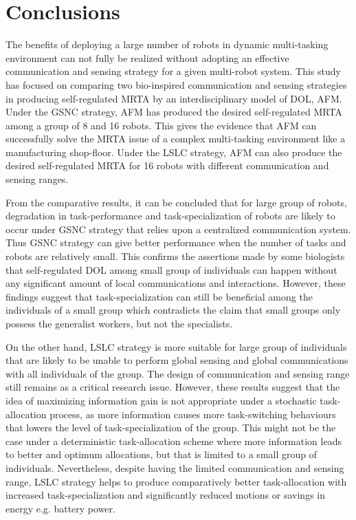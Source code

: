 \chapter{Conclusions}
The benefits of deploying a large number of robots in dynamic multi-tasking environment can not fully be realized without adopting an effective communication and sensing strategy for a given multi-robot system. This study has focused on comparing two bio-inspired  communication and sensing strategies in producing self-regulated MRTA by an interdisciplinary model of DOL, AFM. Under the GSNC strategy, AFM has produced the desired self-regulated MRTA among a group of 8 and 16 robots. This gives the evidence that AFM can successfully solve the MRTA issue of a complex multi-tasking environment like a manufacturing shop-floor. Under the LSLC strategy, AFM can also produce the desired self-regulated MRTA for 16 robots with different communication and sensing ranges.

From the comparative results, it can be concluded that for large group of robots,  degradation in  task-performance and task-specialization of robots are likely to occur  under GSNC strategy that relies upon a centralized communication system. Thus GSNC strategy can give better performance when the number of tasks and robots are relatively small. This confirms the assertions made by some biologists that self-regulated DOL among small group of individuals can happen without any significant amount of local communications and interactions. However, these findings suggest that task-specialization can still be beneficial among the individuals of a small group which contradicts the claim that small groups only possess the generalist workers, but not the specialists.

On the other hand, LSLC strategy is more suitable for large group of individuals that are likely to be unable to perform global sensing and global communications with all individuals of the group. The design of communication and sensing range still remains as a critical research issue. However, these results suggest that the idea of maximizing information gain is not appropriate under a stochastic task-allocation process, as more information causes more task-switching behaviours that lowers the level of task-specialization of the group. This might not be the case under a deterministic task-allocation scheme where more information leads to better and optimum allocations, but that is limited to a small group of individuals. Nevertheless, despite having the limited communication and sensing range, LSLC strategy helps to produce comparatively better task-allocation with increased task-specialization and significantly reduced motions or savings in energy e.g. battery power.

